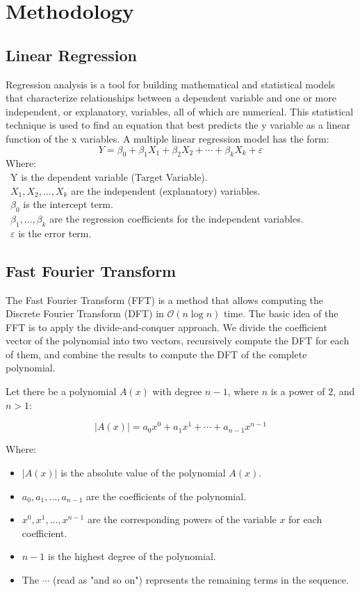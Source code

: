 \documentclass{ieeeojies}
\begin{document}
\section{Methodology}
\subsection{Linear Regression}
Regression analysis is a tool for building mathematical and statistical models that characterize relationships between a dependent variable and one or more independent, or explanatory, variables, all of which are numerical. This statistical technique is used to find an equation that best predicts the y variable as a linear function of the x variables.
A multiple linear regression model has the form: 
\[Y=\beta_0+\beta_1X_1+\beta_2X_2+\cdots+\beta_kX_k+\varepsilon\]
Where:\\
	\indent\textbullet\ Y is the dependent variable (Target Variable).\\
	\indent\textbullet\ \(X_1, X_2, \ldots, X_k\) are the independent (explanatory) variables.\\
	\indent\textbullet\ \(\beta_0\) is the intercept term.\\
	\indent\textbullet\ \(\beta_1,..., \beta_k\) are the regression coefficients for the independent variables.\\
	\indent\textbullet\ \(\varepsilon\) is the error term.
\subsection{Fast Fourier Transform }
The Fast Fourier Transform (FFT) is a method that allows computing the Discrete Fourier Transform (DFT) in $\mathcal{O}(n \log n)$ time. The basic idea of the FFT is to apply the divide-and-conquer approach. We divide the coefficient vector of the polynomial into two vectors, recursively compute the DFT for each of them, and combine the results to compute the DFT of the complete polynomial.

Let there be a polynomial $A(x)$ with degree $n - 1$, where $n$ is a power of $2$, and $n > 1$:

\begin{equation*}
|A(x)| = a_0x^0 + a_1x^1 + \cdots + a_{n-1}x^{n-1}
\end{equation*}

Where:

\begin{itemize}
    \item $|A(x)|$ is the absolute value of the polynomial $A(x)$.
    \item $a_0, a_1, \ldots, a_{n-1}$ are the coefficients of the polynomial.
    \item $x^0, x^1, \ldots, x^{n-1}$ are the corresponding powers of the variable $x$ for each coefficient.
    \item $n - 1$ is the highest degree of the polynomial.
    \item The $\cdots$ (read as "and so on") represents the remaining terms in the sequence.
\end{itemize}
\end{document}
